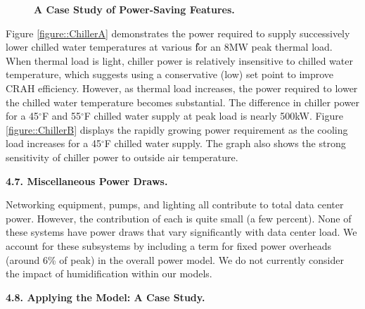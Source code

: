 \begin{figure}[ht]
\begin{minipage}[b]{0.5\linewidth}
  \caption{\textbf{ A Case Study of Power-Saving Features.} }
  \label{figure::comparison}
  \end{minipage}

\end{figure}

Figure \ref{figure::ChillerA} demonstrates the power required to supply successively lower chilled water temperatures at various \U for an 8MW peak thermal load.
When thermal load is light, chiller power is relatively insensitive to chilled water temperature, which suggests using a conservative (low) set point to improve CRAH efficiency.  
However, as thermal load increases, the power required to lower the chilled water temperature becomes substantial.
The difference in chiller power for a 45$^{\circ}$F and 55$^{\circ}$F chilled water supply at peak load is nearly 500kW.
Figure \ref{figure::ChillerB} displays the rapidly growing power requirement as the cooling load increases for a 45$^{\circ}$F chilled water supply.
The graph also shows the strong sensitivity of chiller power to outside air temperature.

{\bf 4.7. Miscellaneous Power Draws.} 

Networking equipment, pumps, and lighting all contribute to total data center power.  However, the contribution of each is quite small (a few percent). None of these systems have power draws that vary significantly with data center load.  We account for these subsystems by including a term for fixed power overheads (around 6\% of peak) in the overall power model.  We do not currently consider the impact of humidification within our models.

{\bf 4.8. Applying the Model: A Case Study.} 

